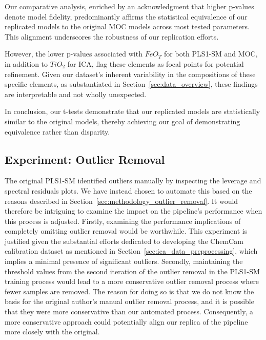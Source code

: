 Our comparative analysis, enriched by an acknowledgment that higher p-values denote model fidelity, predominantly affirms the statistical equivalence of our replicated models to the original MOC models across most tested parameters.
This alignment underscores the robustness of our replication efforts.

However, the lower p-values associated with $FeO_T$ for both PLS1-SM and MOC, in addition to $TiO_2$ for ICA, flag these elements as focal points for potential refinement.
Given our dataset's inherent variability in the compositions of these specific elements, as substantiated in Section~\ref{sec:data_overview}, these findings are interpretable and not wholly unexpected.

In conclusion, our t-tests demonstrate that our replicated models are statistically similar to the original models, thereby achieving our goal of demonstrating equivalence rather than disparity.


\subsection{Experiment: Outlier Removal}\label{sec:experiment_outlier_removal}

The original PLS1-SM identified outliers manually by inspecting the leverage and spectral residuals plots.
We have instead chosen to automate this based on the reasons described in Section~\ref{sec:methodology_outlier_removal}.
It would therefore be intriguing to examine the impact on the pipeline's performance when this process is adjusted.
Firstly, examining the performance implications of completely omitting outlier removal would be worthwhile.
This experiment is justified given the substantial efforts dedicated to developing the ChemCam calibration dataset as mentioned in Section~\ref{sec:ica_data_preprocessing}, which implies a minimal presence of significant outliers.
Secondly, maintaining the threshold values from the second iteration of the outlier removal in the PLS1-SM training process would lead to a more conservative outlier removal process where fewer samples are removed.
The reason for doing so is that we do not know the basis for the original author's manual outlier removal process, and it is possible that they were more conservative than our automated process.
Consequently, a more conservative approach could potentially align our replica of the pipeline more closely with the original.

